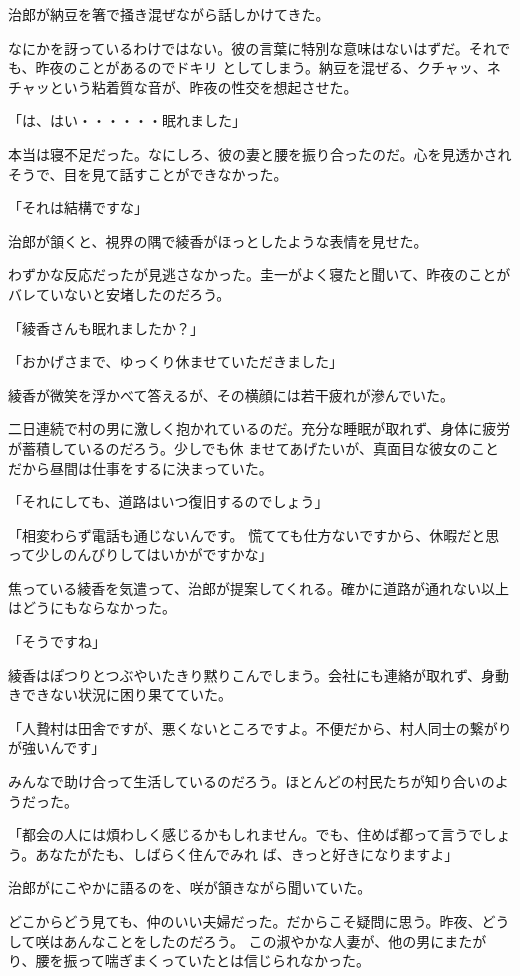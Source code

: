 ﻿\documentclass[book,tate]{jlreq}
\begin{document}
治郎が納豆を箸で掻き混ぜながら話しかけてきた。

なにかを訝っているわけではない。彼の言葉に特別な意味はないはずだ。それでも、昨夜のことがあるのでドキリ としてしまう。納豆を混ぜる、クチャッ、ネチャッという粘着質な音が、昨夜の性交を想起させた。

「は、はい・・・・・・眠れました」

本当は寝不足だった。なにしろ、彼の妻と腰を振り合ったのだ。心を見透かされそうで、目を見て話すことができなかった。

「それは結構ですな」

治郎が頷くと、視界の隅で綾香がほっとしたような表情を見せた。

わずかな反応だったが見逃さなかった。圭一がよく寝たと聞いて、昨夜のことがバレていないと安堵したのだろう。

「綾香さんも眠れましたか？」

「おかげさまで、ゆっくり休ませていただきました」

綾香が微笑を浮かべて答えるが、その横顔には若干疲れが滲んでいた。

二日連続で村の男に激しく抱かれているのだ。充分な睡眠が取れず、身体に疲労が蓄積しているのだろう。少しでも休 ませてあげたいが、真面目な彼女のことだから昼間は仕事をするに決まっていた。

「それにしても、道路はいつ復旧するのでしょう」

「相変わらず電話も通じないんです。 慌てても仕方ないですから、休暇だと思って少しのんびりしてはいかがですかな」

焦っている綾香を気遣って、治郎が提案してくれる。確かに道路が通れない以上はどうにもならなかった。

「そうですね」

綾香はぽつりとつぶやいたきり黙りこんでしまう。会社にも連絡が取れず、身動きできない状況に困り果てていた。

「人贄村は田舎ですが、悪くないところですよ。不便だから、村人同士の繋がりが強いんです」

みんなで助け合って生活しているのだろう。ほとんどの村民たちが知り合いのようだった。

「都会の人には煩わしく感じるかもしれません。でも、住めば都って言うでしょう。あなたがたも、しばらく住んでみれ ば、きっと好きになりますよ」

治郎がにこやかに語るのを、咲が頷きながら聞いていた。

どこからどう見ても、仲のいい夫婦だった。だからこそ疑問に思う。昨夜、どうして咲はあんなことをしたのだろう。 この淑やかな人妻が、他の男にまたがり、腰を振って喘ぎまくっていたとは信じられなかった。
\end{document}
